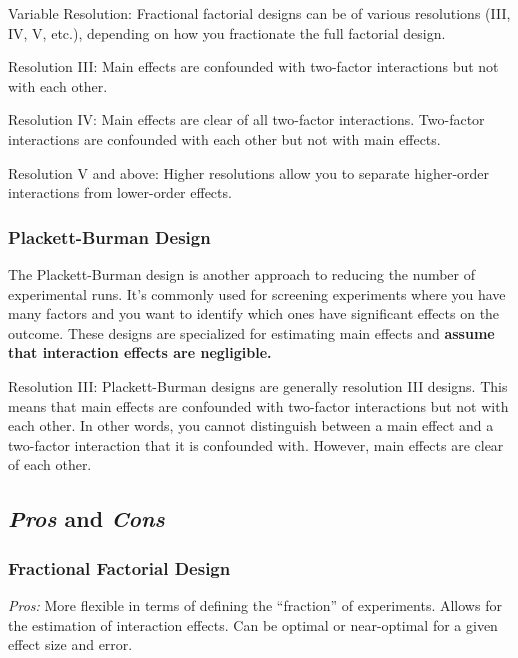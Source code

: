 \documentclass[
  12pt,
  a4paper,
]{article}
\numberwithin{equation}{section}
\theoremstyle{plain}
\theoremstyle{definition}
\theoremstyle{remark}
\theoremstyle{note}
\begin{document}
Variable Resolution: Fractional factorial designs can be of various
resolutions (III, IV, V, etc.), depending on how you fractionate the
full factorial design.

Resolution III: Main effects are confounded with two-factor interactions
but not with each other.

Resolution IV: Main effects are clear of all two-factor interactions.
Two-factor interactions are confounded with each other but not with main
effects.

Resolution V and above: Higher resolutions allow you to separate
higher-order interactions from lower-order effects.

\hypertarget{plackett-burman-design}{%
\subsubsection{Plackett-Burman Design}\label{plackett-burman-design}}

The Plackett-Burman design is another approach to reducing the number of
experimental runs. It's commonly used for screening experiments where
you have many factors and you want to identify which ones have
significant effects on the outcome. These designs are specialized for
estimating main effects and \textbf{assume that interaction effects are
negligible.}

Resolution III: Plackett-Burman designs are generally resolution III
designs. This means that main effects are confounded with two-factor
interactions but not with each other. In other words, you cannot
distinguish between a main effect and a two-factor interaction that it
is confounded with. However, main effects are clear of each other.

\hypertarget{pros-and-cons}{%
\subsection{\texorpdfstring{\emph{Pros} and
\emph{Cons}}{Pros and Cons}}\label{pros-and-cons}}

\hypertarget{fractional-factorial-design}{%
\subsubsection{Fractional Factorial
Design}\label{fractional-factorial-design}}

\emph{Pros:} More flexible in terms of defining the ``fraction'' of
experiments. Allows for the estimation of interaction effects. Can be
optimal or near-optimal for a given effect size and error.
\end{document}
